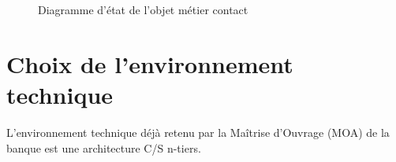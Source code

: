 \begin{figure}[H]
\noindent{}
\caption{Diagramme d'état de l'objet métier contact}
\end{figure}

\section{Choix  de  l’environnement  technique}
L’environnement  technique  déjà  retenu  par  la 
Maîtrise d’Ouvrage (MOA) de la banque est une architecture C/S n-tiers. 
